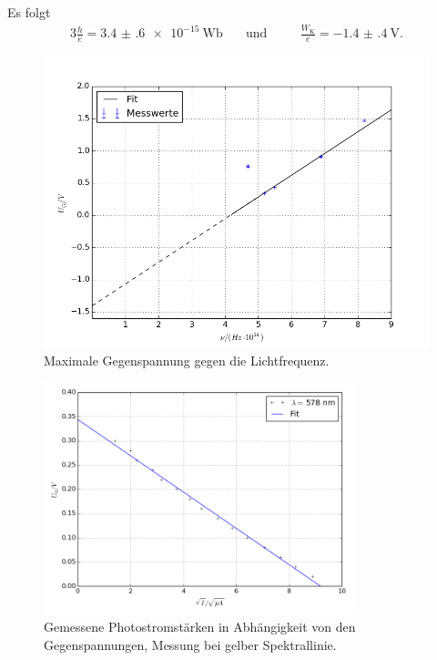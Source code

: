 Es folgt
\begin{alignat}{3}
	\frac{h}{e}=\SI{3.4(6)e-15}{\weber} \quad&\text{und} \quad&&\frac{W_\text{K}}{e}= \SI{-1.4(4)}{\volt}.
\end{alignat}
\begin{figure}[H]
	\centering
	\includegraphics[width=\textwidth]{Bilder/unu_diag.png}
	\caption{Maximale Gegenspannung gegen die Lichtfrequenz. \cite{matplotlib}}
	\label{fig:unu}
\end{figure}
\newpage
\begin{figure}[p]
	\centering
	\includegraphics[width=0.8\textwidth]{Bilder/Fit_gelb.png}
	\caption{Gemessene Photostromstärken in Abhängigkeit von den Gegenspannungen, Messung bei gelber Spektrallinie.\cite{matplotlib}}
	\label{fig:uidiagramm1}
\end{figure}
